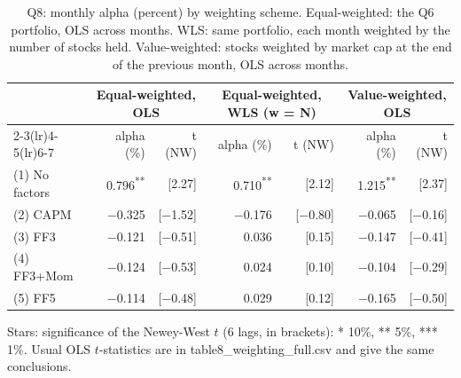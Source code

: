 \begin{table}[!htbp]
\centering
\small
\caption{Q8: monthly alpha (percent) by weighting scheme. Equal-weighted: the Q6 portfolio, OLS across months. WLS: same portfolio, each month weighted by the number of stocks held. Value-weighted: stocks weighted by market cap at the end of the previous month, OLS across months.}
\label{tab:q8}
\begin{tabular}{lrrrrrr}
\toprule
 & \multicolumn{2}{c}{Equal-weighted, OLS} & \multicolumn{2}{c}{Equal-weighted, WLS (w = N)} & \multicolumn{2}{c}{Value-weighted, OLS} \\
\cmidrule(lr){2-3}\cmidrule(lr){4-5}\cmidrule(lr){6-7}
 & alpha (\%) & t (NW) & alpha (\%)  & t (NW)  & alpha (\%)   & t (NW)   \\
\midrule
(1) No factors & 0.796\textsuperscript{**} & [2.27] & 0.710\textsuperscript{**} & [2.12] & 1.215\textsuperscript{**} & [2.37] \\
(2) CAPM & $-$0.325 & [$-$1.52] & $-$0.176 & [$-$0.80] & $-$0.065 & [$-$0.16] \\
(3) FF3 & $-$0.121 & [$-$0.51] & 0.036 & [0.15] & $-$0.147 & [$-$0.41] \\
(4) FF3+Mom & $-$0.124 & [$-$0.53] & 0.024 & [0.10] & $-$0.104 & [$-$0.29] \\
(5) FF5 & $-$0.114 & [$-$0.48] & 0.029 & [0.12] & $-$0.165 & [$-$0.50] \\
\bottomrule
\end{tabular}
\par\vspace{3pt}
{\footnotesize Stars: significance of the Newey-West $t$ (6 lags, in brackets): * 10\%, ** 5\%, *** 1\%. Usual OLS $t$-statistics are in table8\_weighting\_full.csv and give the same conclusions.}
\end{table}
